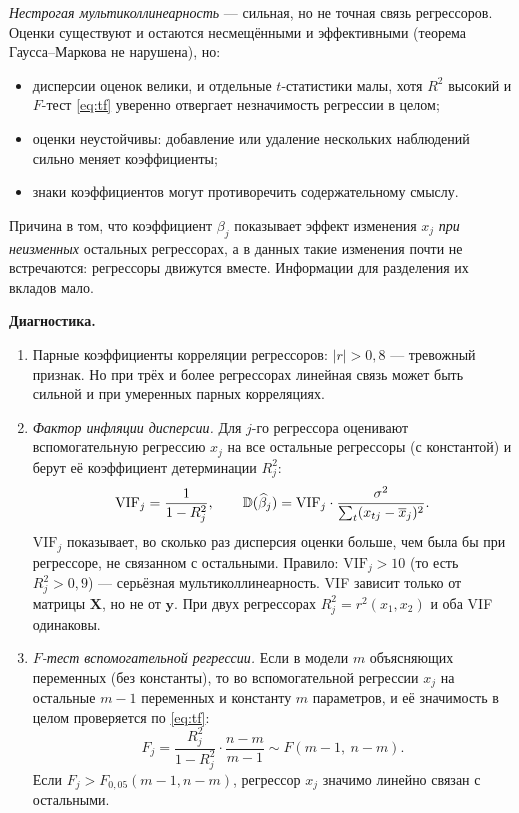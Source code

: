\emph{Нестрогая мультиколлинеарность} — сильная, но не точная связь
регрессоров. Оценки существуют и остаются несмещёнными и эффективными
(теорема Гаусса--Маркова не нарушена), но:
\begin{itemize}[leftmargin=2.2em, itemsep=2pt]
  \item дисперсии оценок велики, и отдельные $t$-статистики малы, хотя $R^2$
        высокий и $F$-тест \eqref{eq:tf} уверенно отвергает незначимость
        регрессии в целом;
  \item оценки неустойчивы: добавление или удаление нескольких наблюдений
        сильно меняет коэффициенты;
  \item знаки коэффициентов могут противоречить содержательному смыслу.
\end{itemize}
Причина в том, что коэффициент $\beta_j$ показывает эффект изменения $x_j$
\emph{при неизменных} остальных регрессорах, а в данных такие изменения почти
не встречаются: регрессоры движутся вместе. Информации для разделения их
вкладов мало.

\textbf{Диагностика.}
\begin{enumerate}[label=\arabic*), leftmargin=2.2em, itemsep=2pt]
  \item Парные коэффициенты корреляции регрессоров: $|r| > 0{,}8$ —
        тревожный признак. Но при трёх и более регрессорах линейная связь
        может быть сильной и при умеренных парных корреляциях.
  \item \emph{Фактор инфляции дисперсии.} Для $j$-го регрессора оценивают
        вспомогательную регрессию $x_j$ на все остальные регрессоры (с
        константой) и берут её коэффициент детерминации $R_j^2$:
        \begin{equation}
          \mathrm{VIF}_j = \frac{1}{1 - R_j^2},
          \qquad
          \mathbb{D}(\widehat{\beta}_j)
          = \mathrm{VIF}_j\cdot\frac{\sigma^2}{\sum_t (x_{tj} - \overline{x}_j)^2} .
          \label{eq:vif}
        \end{equation}
        $\mathrm{VIF}_j$ показывает, во сколько раз дисперсия оценки больше,
        чем была бы при регрессоре, не связанном с остальными. Правило:
        $\mathrm{VIF}_j > 10$ (то есть $R_j^2 > 0{,}9$) — серьёзная
        мультиколлинеарность. VIF зависит только от матрицы $\mathbf{X}$, но
        не от $\mathbf{y}$. При двух регрессорах $R_j^2 = r^2(x_1, x_2)$ и
        оба VIF одинаковы.
  \item \emph{$F$-тест вспомогательной регрессии.} Если в модели $m$
        объясняющих переменных (без константы), то во вспомогательной
        регрессии $x_j$ на остальные $m - 1$ переменных и константу $m$
        параметров, и её значимость в целом проверяется по \eqref{eq:tf}:
        \begin{equation}
          F_j = \frac{R_j^2}{1 - R_j^2}\cdot\frac{n-m}{m-1} \sim F(m-1,\ n-m).
          \label{eq:fj}
        \end{equation}
        Если $F_j > F_{0{,}05}(m-1, n-m)$, регрессор $x_j$ значимо линейно
        связан с остальными.
\end{enumerate}

